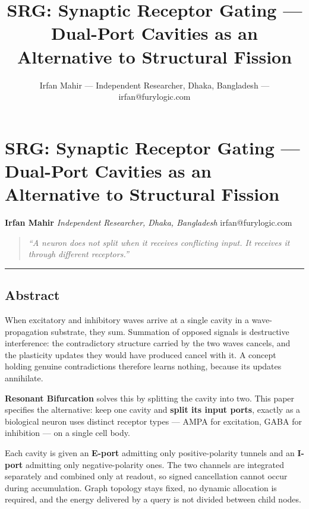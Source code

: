 \documentclass[
  11pt,
  a4paper,
]{article}
\title{SRG: Synaptic Receptor Gating --- Dual-Port Cavities as an
Alternative to Structural Fission}
\author{Irfan Mahir --- Independent Researcher, Dhaka, Bangladesh ---
irfan@furylogic.com}
\date{}
\begin{document}
\maketitle

{
\hypersetup{linkcolor=}
\setcounter{tocdepth}{3}
\tableofcontents
}
\section{SRG: Synaptic Receptor Gating --- Dual-Port Cavities as an
Alternative to Structural
Fission}\label{srg-synaptic-receptor-gating-dual-port-cavities-as-an-alternative-to-structural-fission}

\textbf{Irfan Mahir} \emph{Independent Researcher, Dhaka, Bangladesh}
irfan@furylogic.com

\begin{quote}
\emph{``A neuron does not split when it receives conflicting input. It
receives it through different receptors.''}
\end{quote}

\begin{center}\rule{0.5\linewidth}{0.5pt}\end{center}

\subsection{Abstract}\label{abstract}

When excitatory and inhibitory waves arrive at a single cavity in a
wave-propagation substrate, they sum. Summation of opposed signals is
destructive interference: the contradictory structure carried by the two
waves cancels, and the plasticity updates they would have produced
cancel with it. A concept holding genuine contradictions therefore
learns nothing, because its updates annihilate.

\textbf{Resonant Bifurcation} solves this by splitting the cavity into
two. This paper specifies the alternative: keep one cavity and
\textbf{split its input ports}, exactly as a biological neuron uses
distinct receptor types --- AMPA for excitation, GABA for inhibition ---
on a single cell body.

Each cavity is given an \textbf{E-port} admitting only positive-polarity
tunnels and an \textbf{I-port} admitting only negative-polarity ones.
The two channels are integrated separately and combined only at readout,
so signed cancellation cannot occur during accumulation. Graph topology
stays fixed, no dynamic allocation is required, and the energy delivered
by a query is not divided between child nodes.
\end{document}
